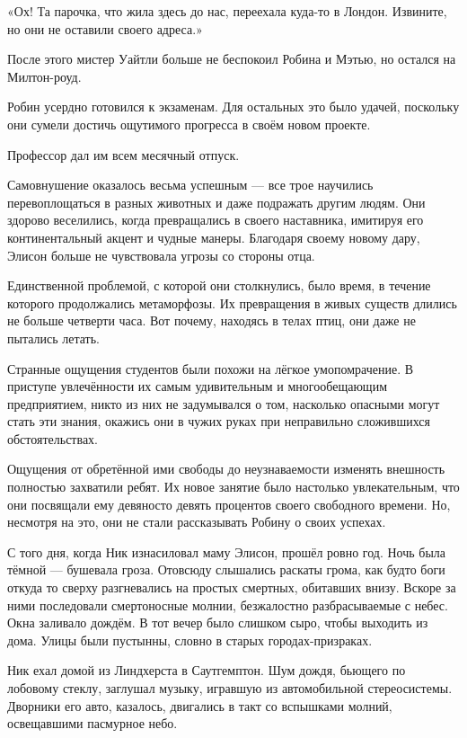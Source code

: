 \documentclass[a5paper, 9pt,
final, openany, twoside=true]{memoir}
\begin{document}
«Ох! Та парочка, что жила здесь до нас, переехала куда-то в Лондон. Извините, но они не оставили своего адреса.»

После этого мистер Уайтли больше не беспокоил Робина и Мэтью, но остался на Милтон-роуд.\bigskip

Робин усердно готовился к экзаменам. Для остальных это было удачей, поскольку они сумели достичь ощутимого прогресса в своём новом проекте.

Профессор дал им всем месячный отпуск.

Самовнушение оказалось весьма успешным — все трое научились перевоплощаться в разных животных и даже подражать другим людям. Они здорово веселились, когда  превращались в своего наставника, имитируя его континентальный акцент и чудные манеры. Благодаря своему новому дару, Элисон больше не чувствовала угрозы со стороны отца.

Единственной проблемой, с которой они столкнулись, было время, в течение которого продолжались метаморфозы. Их превращения в живых существ длились не больше четверти часа. Вот почему, находясь в телах птиц, они даже не пытались летать.

Странные ощущения студентов были похожи на лёгкое умопомрачение. В приступе увлечённости их самым удивительным и многообещающим предприятием, никто из них не задумывался о том, насколько опасными могут стать эти знания, окажись они в чужих руках при неправильно сложившихся обстоятельствах.

Ощущения от обретённой ими свободы до неузнаваемости изменять внешность полностью захватили ребят. Их новое занятие было настолько увлекательным, что они посвящали ему девяносто девять процентов своего свободного времени. Но, несмотря на это, они не стали рассказывать Робину о своих успехах.\bigskip

С того дня, когда Ник изнасиловал маму Элисон, прошёл ровно год. Ночь была тёмной — бушевала гроза. Отовсюду слышались раскаты грома, как будто боги откуда то сверху разгневались на простых смертных, обитавших внизу. Вскоре за ними последовали смертоносные молнии, безжалостно разбрасываемые с небес. Окна заливало дождём. В тот вечер было слишком сыро, чтобы выходить из дома. Улицы были пустынны, словно в старых городах-призраках.

Ник ехал домой из Линдхерста в Саутгемптон. Шум дождя, бьющего по лобовому стеклу, заглушал музыку, игравшую из автомобильной стереосистемы. Дворники его авто, казалось, двигались в такт со вспышками молний, освещавшими пасмурное небо.
\end{document}
